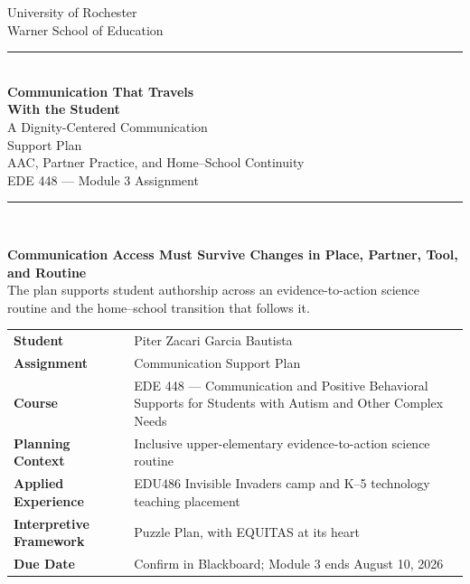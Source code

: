 \documentclass[11pt]{article}
\begin{document}
\hypersetup{pageanchor=false}
\begin{titlepage}
\thispagestyle{empty}

\begin{center}
{\large University of Rochester\\}
{\normalsize Warner School of Education\\[0.15in]}

{\color{PrimaryRed}\rule{\textwidth}{1.4pt}}\\[0.12in]
{\Huge\bfseries Communication That Travels\\[0.07in]
With the Student}\\[0.15in]
{\huge A Dignity-Centered Communication\\[0.06in]
Support Plan}\\[0.12in]
{\Large AAC, Partner Practice, and Home--School Continuity}\\[0.14in]
{\large EDE 448 --- Module 3 Assignment}\\[0.10in]

\vfill

{\color{PrimaryRed}\rule{0.78\textwidth}{0.7pt}}\\[0.18in]

\colorbox{SoftBlue}{%
\parbox{0.88\textwidth}{%
\centering\small\vspace{0.02in}
\textbf{Communication Access Must Survive Changes in Place, Partner, Tool, and Routine}\\[0.04in]
The plan supports student authorship across an evidence-to-action science routine and the home--school transition that follows it.
}%
}
\end{center}

\vfill

\begin{center}
\renewcommand{\arraystretch}{1.18}
\setlength{\tabcolsep}{4pt}
\begin{tabular}{>{\bfseries\RaggedLeft\arraybackslash}p{1.85in} >{\RaggedRight\arraybackslash}p{5.0in}}
Student & Piter Zacari Garcia Bautista \\
Assignment & Communication Support Plan \\
Course & EDE 448 --- Communication and Positive Behavioral Supports for Students with Autism and Other Complex Needs \\
Planning Context & Inclusive upper-elementary evidence-to-action science routine \\
Applied Experience & EDU486 Invisible Invaders camp and K--5 technology teaching placement \\
Interpretive Framework & Puzzle Plan, with EQUITAS at its heart \\
Due Date & Confirm in Blackboard; Module 3 ends August 10, 2026 \\
\end{tabular}
\end{center}


\end{titlepage}
\end{document}
